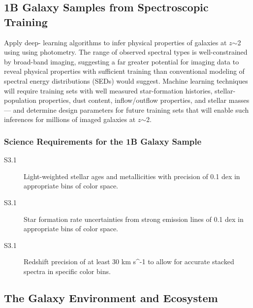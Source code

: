 \documentclass[preprint,11pt]{aastex}
\newcommand{\kms}{{\rm km s^{-1}}}
\begin{document}
\subsection{1B Galaxy Samples from Spectroscopic Training}
\label{sec:1Bgalaxies}

Apply deep-
learning algorithms to infer physical properties of galaxies at
$z$$\sim$2 using using photometry. The range of observed spectral
types is well-constrained by broad-band imaging,
suggesting a far greater potential for imaging data to reveal physical
properties with sufficient training than conventional modeling of
spectral energy distributions (SEDs) would suggest.  Machine
learning techniques will require training sets with well measured star-formation histories,
stellar-population properties, dust content, inflow/outflow properties,
and stellar masses --- and determine design parameters for future training sets that will enable such inferences for millions of imaged galaxies at $z$$\sim$2.

\subsubsection{Science Requirements for the 1B Galaxy Sample}

\begin{description}

\item[S3.1] Light-weighted stellar ages and metallicities with precision of 0.1 dex in appropriate bins of color space.

\item[S3.1] Star formation rate uncertainties from strong emission lines of 0.1 dex in appropriate bins of color space.

\item[S3.1] Redshift precision of at least 30 \kms{} to allow for accurate stacked spectra in specific color bins.

\end{description}


\subsection{The Galaxy Environment and Ecosystem}
\label{sec:ecosystem}
\end{document}
